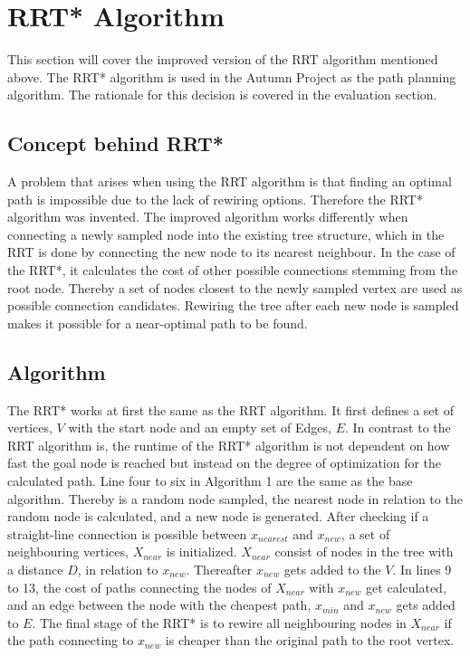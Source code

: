 \section{RRT* Algorithm}

This section will cover the improved version of the RRT algorithm mentioned above. The RRT* algorithm is used in the Autumn Project as the path planning algorithm. The rationale for this decision is covered in the evaluation section. 

\subsection{Concept behind RRT*}

A problem that arises when using the RRT algorithm is that finding an optimal path is impossible due to the lack of rewiring options. Therefore the RRT* algorithm was invented. 
The improved algorithm works differently when connecting a newly sampled node into the existing tree structure, which in the RRT is done by connecting the new node to its nearest neighbour. In the case of the RRT*, it calculates the cost of other possible connections stemming from the root node. Thereby a set of nodes closest to the newly sampled vertex are used as possible connection candidates. Rewiring the tree after each new node is sampled makes it possible for a near-optimal path to be found.

\subsection{Algorithm}

The RRT* works at first the same as the RRT algorithm. It first defines a set of vertices, $V$ with the start node and an empty set of Edges, $E$. In contrast to the RRT algorithm is, the runtime of the RRT* algorithm is not dependent on how fast the goal node is reached but instead on the degree of optimization for the calculated path.
Line four to six in Algorithm 1 are the same as the base algorithm. Thereby is a random node sampled, the nearest node in relation to the random node is calculated, and a new node is generated. After checking if a straight-line connection is possible between $x_{nearest}$ and $x_{new}$, a set of neighbouring vertices, $X_{near}$ is initialized.
$X_{near}$ consist of nodes in the tree with a distance $D$, in relation to $x_{new}$. Thereafter $x_{new}$ gets added to the $V$. In lines 9 to 13, the cost of paths connecting the nodes of $X_{near}$ with $x_{new}$ get calculated, and an edge between the node with the cheapest path, $x_{min}$ and $x_{new}$ gets added to $E$. The final stage of the RRT* is to rewire all neighbouring nodes in $X_{near}$ if the path connecting to $x_{new}$ is cheaper than the original path to the root vertex. 

